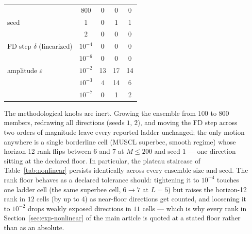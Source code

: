 \documentclass[11pt,a4paper]{article}
\begin{document}
\begin{table}[htbp]
\begin{tabular}{@{}lcccc@{}}
                              & 800       & 0                                         & 0          & 0                      \\
\addlinespace
seed                          & 1         & 0                                         & 1          & 1                      \\
                              & 2         & 0                                         & 0          & 0                      \\
\addlinespace
FD step $\delta$ (linearized) & $10^{-4}$ & 0                                         & 0          & 0                      \\
                              & $10^{-6}$ & 0                                         & 0          & 0                      \\
\addlinespace
amplitude $\varepsilon$       & $10^{-2}$ & 13                                        & 17         & 14                     \\
                              & $10^{-3}$ & 4                                         & 14         & 6                      \\
                              & $10^{-7}$ & 0                                         & 1          & 2                      \\
\bottomrule
\end{tabular}
\end{table}

The methodological knobs are inert.
Growing the ensemble from $100$ to $800$ members, redrawing all directions (seeds $1$, $2$), and moving the FD step across two orders of magnitude leave every reported ladder unchanged; the only motion anywhere is a single borderline cell (MUSCL superbee, smooth regime) whose horizon-12 rank flips between $6$ and $7$ at $M\le200$ and seed $1$ --- one direction sitting at the declared floor.
In particular, the plateau staircase of Table~\ref{tab:nonlinear} persists identically across every ensemble size and seed.
The rank floor behaves as a declared tolerance should: tightening it to $10^{-4}$ touches one ladder cell (the same superbee cell, $6\to7$ at $L=5$) but raises the horizon-12 rank in $12$ cells (by up to $4$) as near-floor directions get counted, and loosening it to $10^{-2}$ drops weakly exposed directions in $11$ cells --- which is why every rank in Section~\ref{sec:exp-nonlinear} of the main article is quoted at a stated floor rather than as an absolute.
\end{document}
